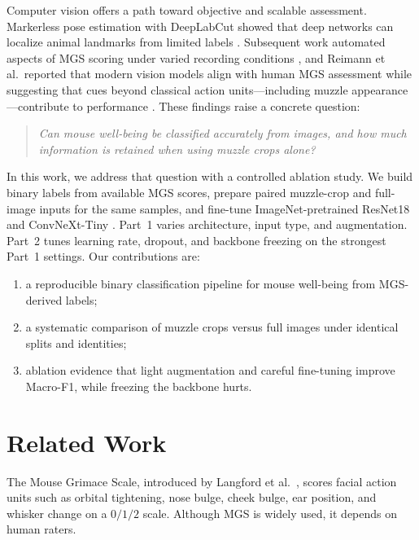 \documentclass[sigconf]{acmart}
\begin{document}
Computer vision offers a path toward objective and scalable assessment.
Markerless pose estimation with DeepLabCut showed that deep networks can
localize animal landmarks from limited labels \cite{Mathis2018}. Subsequent
work automated aspects of MGS scoring under varied recording conditions
\cite{Andresen2026}, and Reimann et al.\ reported that modern vision models
align with human MGS assessment while suggesting that cues beyond classical
action units---including muzzle appearance---contribute to performance
\cite{Reimann2026}. These findings raise a concrete question:

\begin{quote}
\textit{Can mouse well-being be classified accurately from images, and how much
information is retained when using muzzle crops alone?}
\end{quote}

In this work, we address that question with a controlled ablation study.
We build binary labels from available MGS scores, prepare paired muzzle-crop
and full-image inputs for the same samples, and fine-tune ImageNet-pretrained
ResNet18 \cite{He2016} and ConvNeXt-Tiny \cite{Liu2022}. Part~1 varies
architecture, input type, and augmentation. Part~2 tunes learning rate,
dropout, and backbone freezing on the strongest Part~1 settings. Our contributions are:
\begin{enumerate}
  \item a reproducible binary classification pipeline for mouse well-being
  from MGS-derived labels;
  \item a systematic comparison of muzzle crops versus full images under
  identical splits and identities;
  \item ablation evidence that light augmentation and careful fine-tuning
  improve Macro-F1, while freezing the backbone hurts.
\end{enumerate}

\section{Related Work}

The Mouse Grimace Scale, introduced by Langford et al.~\cite{Langford2010},
scores facial action units such as orbital tightening, nose bulge, cheek
bulge, ear position, and whisker change on a $0/1/2$ scale. Although MGS is
widely used, it depends on human raters.
\end{document}
